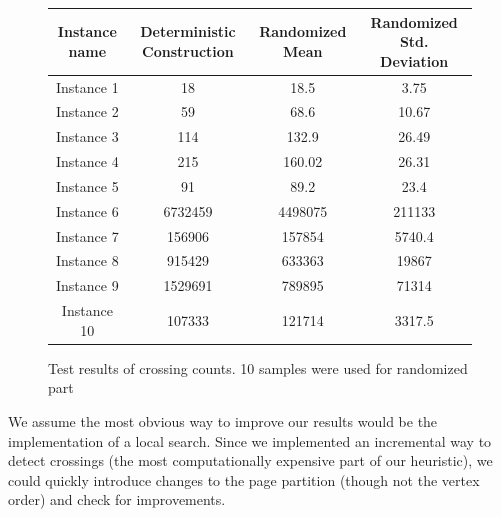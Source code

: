 \documentclass [11pt]{article}
\begin{document}
\begin{figure}[H]
\centering
  \begin{tabular}{| c | c | c | c |}
\hline
Instance name & Deterministic Construction & Randomized Mean & Randomized Std. Deviation \\
\hline
Instance 1 & 18 & 18.5 & 3.75 \\
\hline 
Instance 2 & 59 & 68.6 & 10.67 \\
\hline 
Instance 3 & 114 & 132.9 & 26.49 \\
\hline 
Instance 4 & 215 & 160.02 & 26.31 \\
\hline 
Instance 5 & 91 & 89.2  & 23.4 \\
\hline 
Instance 6 & 6732459 & 4498075 & 211133\\
\hline 
Instance 7 & 156906 & 157854 & 5740.4 \\
\hline 
Instance 8 & 915429 & 633363 & 19867 \\
\hline 
Instance 9 & 1529691 & 789895 & 71314 \\
\hline 
Instance 10 & 107333 & 121714 & 3317.5 \\
\hline 
\end{tabular}
\caption{Test results of crossing counts.  10 samples were used for randomized part}
\end{figure}




We assume the most obvious way to improve our results would be the implementation of a local search. Since we implemented an incremental way to detect crossings (the most computationally expensive part of our heuristic), we could quickly introduce changes to the page partition (though not the vertex order) and check for improvements. 
\end{document}
